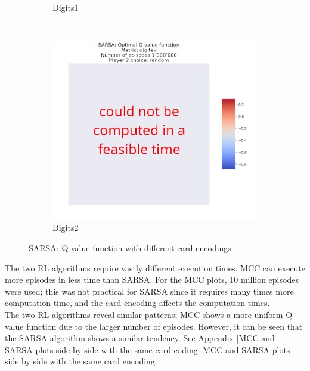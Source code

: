 \begin{figure}[ht!]
\begin{subfigure}{0.5\textwidth}
        \caption[Digits1]{Digits1}
        \label{fig:SARSAdigits1}
    \end{subfigure} \\
    \begin{subfigure}{0.5\textwidth}
        \includegraphics[width=1\linewidth]{Figures/SARSA_digits2_1000000_random}
        \caption[Digits2]{Digits2}
        \label{fig:SARSAdigits2}
    \end{subfigure}
    \caption{SARSA: Q value function with different card encodings}
\label{fig:SARSAl: Q value function with different card encodings}
\end{figure}



\newpage


The two RL algorithms require vastly different execution times. MCC can execute more episodes in less time than SARSA. For the MCC plots, 10 million episodes were used; this was not practical for SARSA since it requires many times more computation time, and the card encoding affects the computation times. \\

The two RL algorithms reveal similar patterns; MCC shows a more uniform Q value function due to the larger number of episodes. However, it can be seen that the SARSA algorithm shows a similar tendency. See Appendix \ref{MCC and SARSA plots side by side with the same card coding} MCC and SARSA plots side by side with the same card encoding. \\

